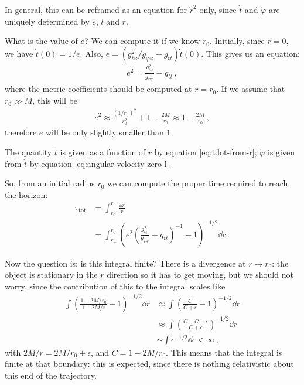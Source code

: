 \documentclass[main.tex]{subfiles}
\begin{document}
In general, this can be reframed as an equation for \(\dot{r}^2\) only, since \(\dot{t}\) and \(\dot{\varphi}\) are uniquely determined by \(e\), \(l\) and \(r\).

What is the value of \(e\)? We can compute it if we know \(r_0\).
Initially, since \(\dot{r} = 0\), we have \(\dot{t}(0) = 1 / e\).
Also, \(e = (g_{t \varphi }^2 / g_{\varphi \varphi } - g_{tt}) \dot{t}(0)\). This gives us an equation: %
\begin{align}
e^2 = \frac{g_{t \varphi }^2}{g_{\varphi \varphi }} - g_{tt}
\,,
\end{align}
%
where the metric coefficients should be computed at \(r = r_0\). 
If we assume that \(r_0 \gg M\), this will be 
%
\begin{align}
e^2 \approx \frac{(1 / r_0 )^2}{r_0^2} + 1 - \frac{2M}{r_0} \approx 1 - \frac{2M}{r_0 }
\,,
\end{align}
%
therefore \(e\) will be only slightly smaller than \(1\). 

The quantity \(\dot{t}\) is given as a function of \(r\) by equation \eqref{eq:tdot-from-r}; \(\dot{\varphi}\) is given from \(\dot{t}\) by equation \eqref{eq:angular-velocity-zero-l}. 

So, from an initial radius \(r_0 \) we can compute the proper time required to reach the horizon: 
%
\begin{align}
\tau _{\text{tot}} &= \int_{r_0}^{r_+} \frac{ \dd{r}}{\dot{r}}  \\
&= \int_{r_+}^{r_0} \left(e^2 \left(\frac{g_{t \varphi }^2}{g_{\varphi \varphi }} - g_{tt}\right)^{-1} - 1\right)^{-1/2} \dd{r} 
\,.
\end{align}

Now the question is: is this integral finite? 
There is a divergence at \(r \to r_0 \): the object is stationary in the \(r\) direction so it has to get moving, but we should not worry, since the contribution of this to the integral scales like 
%
\begin{align}
\int \left(\frac{1 - 2M / r_0 }{1 - 2M / r} -1 \right)^{-1/2} \dd{r} &\approx \int \left(\frac{C }{C+ \epsilon } -1 \right)^{-1/2} \dd{r}  \\
&\approx \int \left(\frac{C - C - \epsilon }{C + \epsilon } \right)^{-1/2} \dd{r}  \\
&\sim \int \epsilon^{-1/2} \dd{\epsilon } < \infty 
\,,
\end{align}
%
with \(2M/r = 2M/r_0 + \epsilon \), and \(C = 1 - 2M/r_0 \).
This means that the integral is finite at that boundary: this is expected, since there is nothing relativistic about this end of the trajectory.
\end{document}
